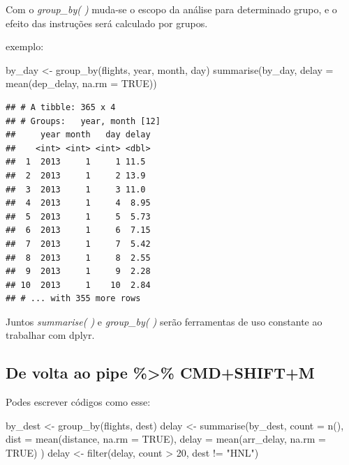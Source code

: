 \documentclass[
]{article}
\newenvironment{Shaded}{\begin{snugshade}}{\end{snugshade}}
\newcommand{\AttributeTok}[1]{\textcolor[rgb]{0.77,0.63,0.00}{#1}}
\newcommand{\ConstantTok}[1]{\textcolor[rgb]{0.00,0.00,0.00}{#1}}
\newcommand{\DecValTok}[1]{\textcolor[rgb]{0.00,0.00,0.81}{#1}}
\newcommand{\FunctionTok}[1]{\textcolor[rgb]{0.00,0.00,0.00}{#1}}
\newcommand{\NormalTok}[1]{#1}
\newcommand{\OtherTok}[1]{\textcolor[rgb]{0.56,0.35,0.01}{#1}}
\newcommand{\SpecialCharTok}[1]{\textcolor[rgb]{0.00,0.00,0.00}{#1}}
\newcommand{\StringTok}[1]{\textcolor[rgb]{0.31,0.60,0.02}{#1}}
\begin{document}
Com o \emph{group\_by( )} muda-se o escopo da análise para determinado
grupo, e o efeito das instruções será calculado por grupos.

exemplo:

\begin{Shaded}
\begin{Highlighting}[]
\NormalTok{by\_day }\OtherTok{\textless{}{-}} \FunctionTok{group\_by}\NormalTok{(flights, year, month, day)}
\FunctionTok{summarise}\NormalTok{(by\_day, }\AttributeTok{delay =} \FunctionTok{mean}\NormalTok{(dep\_delay, }\AttributeTok{na.rm =} \ConstantTok{TRUE}\NormalTok{))}
\end{Highlighting}
\end{Shaded}

\begin{verbatim}
## # A tibble: 365 x 4
## # Groups:   year, month [12]
##     year month   day delay
##    <int> <int> <int> <dbl>
##  1  2013     1     1 11.5 
##  2  2013     1     2 13.9 
##  3  2013     1     3 11.0 
##  4  2013     1     4  8.95
##  5  2013     1     5  5.73
##  6  2013     1     6  7.15
##  7  2013     1     7  5.42
##  8  2013     1     8  2.55
##  9  2013     1     9  2.28
## 10  2013     1    10  2.84
## # ... with 355 more rows
\end{verbatim}

Juntos \emph{summarise( )} e \emph{group\_by( )} serão ferramentas de
uso constante ao trabalhar com dplyr.

\hypertarget{de-volta-ao-pipe-cmdshiftm}{%
\subsection{De volta ao pipe \%\textgreater\%
CMD+SHIFT+M}\label{de-volta-ao-pipe-cmdshiftm}}

Podes escrever códigos como esse:

\begin{Shaded}
\begin{Highlighting}[]
\NormalTok{by\_dest }\OtherTok{\textless{}{-}} \FunctionTok{group\_by}\NormalTok{(flights, dest)}
\NormalTok{delay }\OtherTok{\textless{}{-}} \FunctionTok{summarise}\NormalTok{(by\_dest,}
  \AttributeTok{count =} \FunctionTok{n}\NormalTok{(),}
  \AttributeTok{dist =} \FunctionTok{mean}\NormalTok{(distance, }\AttributeTok{na.rm =} \ConstantTok{TRUE}\NormalTok{),}
  \AttributeTok{delay =} \FunctionTok{mean}\NormalTok{(arr\_delay, }\AttributeTok{na.rm =} \ConstantTok{TRUE}\NormalTok{)}
\NormalTok{)}
\NormalTok{delay }\OtherTok{\textless{}{-}} \FunctionTok{filter}\NormalTok{(delay, count }\SpecialCharTok{\textgreater{}} \DecValTok{20}\NormalTok{, dest }\SpecialCharTok{!=} \StringTok{"HNL"}\NormalTok{)}
\end{Highlighting}
\end{Shaded}
\end{document}
